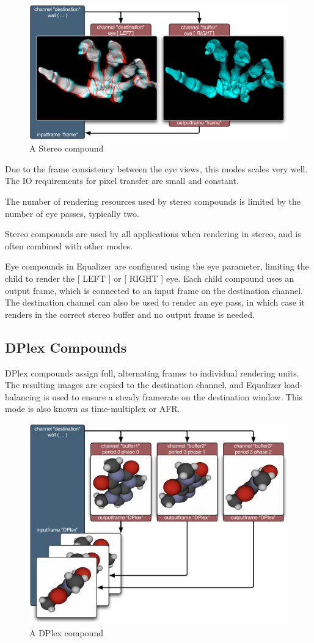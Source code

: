 \documentclass[10pt,a4]{scrartcl}
\begin{document}
\begin{figure}
  \includegraphics[width=.618\textwidth]{images/EYE.pdf}
  {\caption{\label{fStereoCmp}\small A Stereo compound}}
\end{figure}
Due to the frame consistency between the eye views, this modes scales
very well. The IO requirements for pixel transfer are small and
constant.

The number of rendering resources used by stereo compounds is limited by
the number of eye passes, typically two. 

Stereo compounds are used by all applications when rendering in stereo,
and is often combined with other modes.

Eye compounds in Equalizer are configured using the \textsf{eye}
parameter, limiting the child to render the \textsf{[ LEFT ]} or
\textsf{[ RIGHT ]} eye. Each child compound uses an output frame, which
is connected to an input frame on the destination channel. The
destination channel can also be used to render an eye pass, in which case
it renders in the correct stereo buffer and no output frame is needed.


\subsection{\label{sDPlex}DPlex Compounds}

DPlex compounds assign full, alternating frames to individual rendering
units. The resulting images are copied to the destination channel, and
Equalizer load-balancing is used to ensure a steady framerate on the
destination window. This mode is also known as time-multiplex or AFR.

\begin{figure}
  \includegraphics[width=.618\textwidth]{images/DPlex.pdf}
  {\caption{ A DPlex compound}}
\end{figure}
\end{document}

